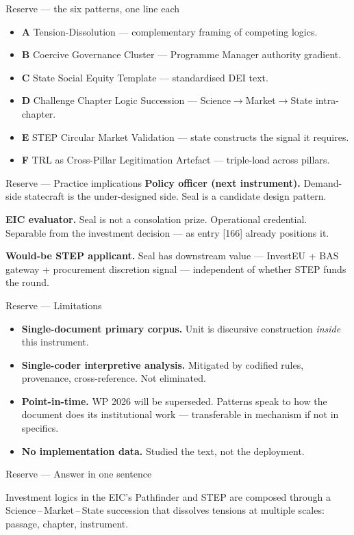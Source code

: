 \documentclass[aspectratio=169,hyperref={pdfpagelabels=false}]{beamer}
\begin{document}
\begin{frame}{Reserve — the six patterns, one line each}
    \begin{itemize}
        \item \textbf{A} Tension-Dissolution — complementary framing of competing logics.
        \item \textbf{B} Coercive Governance Cluster — Programme Manager authority gradient.
        \item \textbf{C} State Social Equity Template — standardised DEI text.
        \item \textbf{D} Challenge Chapter Logic Succession — Science$\to$Market$\to$State intra-chapter.
        \item \textbf{E} STEP Circular Market Validation — state constructs the signal it requires.
        \item \textbf{F} TRL as Cross-Pillar Legitimation Artefact — triple-load across pillars.
    \end{itemize}
\end{frame}

\begin{frame}{Reserve — Practice implications}
    \textbf{Policy officer (next instrument).} Demand-side statecraft is the under-designed side. Seal is a candidate design pattern.

    \vspace{2mm}
    \textbf{EIC evaluator.} Seal is not a consolation prize. Operational credential. Separable from the investment decision — as entry [166] already positions it.

    \vspace{2mm}
    \textbf{Would-be STEP applicant.} Seal has downstream value — InvestEU + BAS gateway + procurement discretion signal — independent of whether STEP funds the round.
\end{frame}

\begin{frame}{Reserve — Limitations}
    \begin{itemize}
        \item \textbf{Single-document primary corpus.} Unit is discursive construction \emph{inside} this instrument.
        \item \textbf{Single-coder interpretive analysis.} Mitigated by codified rules, provenance, cross-reference. Not eliminated.
        \item \textbf{Point-in-time.} WP 2026 will be superseded. Patterns speak to how the document does its institutional work — transferable in mechanism if not in specifics.
        \item \textbf{No implementation data.} Studied the text, not the deployment.
    \end{itemize}
\end{frame}

\begin{frame}{Reserve — Answer in one sentence}
    \begin{block}{}
        Investment logics in the EIC's Pathfinder and STEP are composed through a Science\,--\,Market\,--\,State succession that dissolves tensions at multiple scales: passage, chapter, instrument.
    \end{block}
\end{frame}
\end{document}
